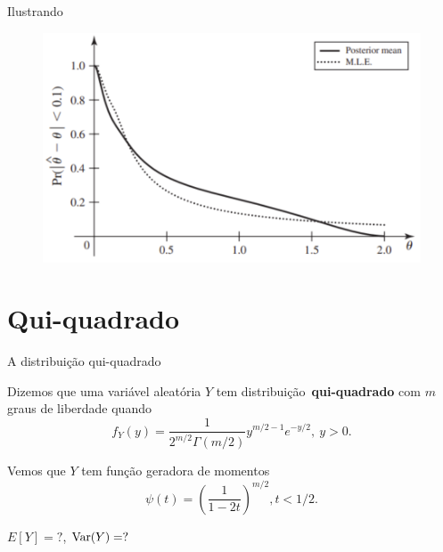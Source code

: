 \begin{frame}{Ilustrando}
 \begin{figure}
  \includegraphics[scale=0.6]{figures/probability_curves_DeGroot8.1.pdf}
 \end{figure}
\end{frame}

\section{Qui-quadrado}

\begin{frame}{A distribuição qui-quadrado}
 \begin{defn}
 Dizemos que uma variável aleatória $Y$ tem distribuição~\textbf{qui-quadrado} com $m$ graus de liberdade quando
 \begin{equation}
 f_Y(y) = \frac{1}{2^{m/2}\Gamma(m/2)} y^{m/2 - 1}e^{-y/2}, \: y >0.
 \end{equation} 
 
 Vemos que $Y$ tem função geradora de momentos
\[\psi(t) = \left( \frac{1}{1-2t}\right)^{m/2}, t < 1/2 .\]
 \end{defn}
$E[Y] = ?$, $\operatorname{Var}(Y) =?$  
\end{frame}

